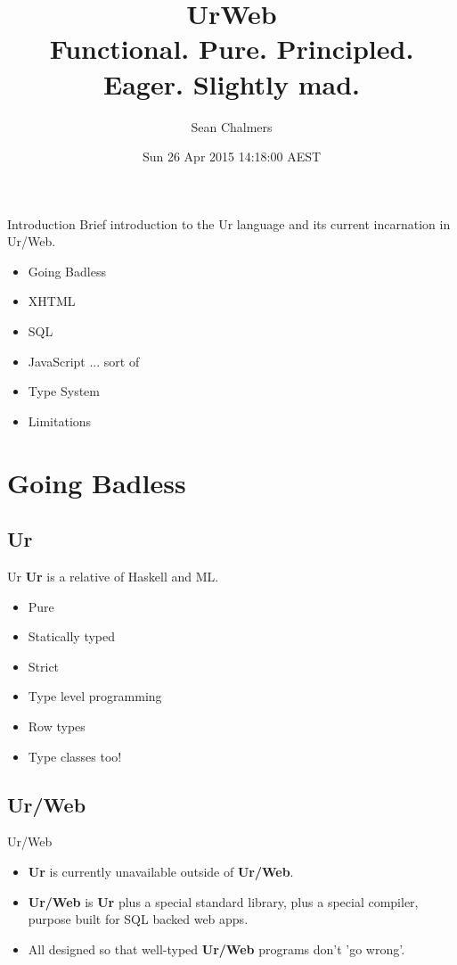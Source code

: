 \documentclass{beamer}
\title[Introduction to UrWeb]{UrWeb\\Functional. Pure. Principled. Eager. Slightly mad.}
\author{Sean Chalmers}
\date{Sun 26 Apr 2015 14:18:00 AEST}
\begin{document}
\begin{frame}
\titlepage
\end{frame}


\begin{frame}{Introduction}
Brief introduction to the Ur language and its current incarnation in Ur/Web.

\begin{itemize}
\item Going Badless
\item XHTML
\item SQL
\item JavaScript ... sort of
\item Type System
\item Limitations
\end{itemize}
\end{frame}

\section{Going Badless}
\subsection{Ur}

\begin{frame}{Ur}
\textbf{Ur} is a relative of Haskell and ML.

\begin{itemize}
\item Pure
\item Statically typed
\item Strict
\item Type level programming
\item Row types
\item Type classes too!
\end{itemize}
\end{frame}

\subsection{Ur/Web}
\begin{frame}{Ur/Web}

\begin{itemize}
\item \textbf{Ur} is currently unavailable outside of \textbf{Ur/Web}.
\item \textbf{Ur/Web} is \textbf{Ur} plus a special standard library,
 plus a special compiler, purpose built for SQL backed web apps.
\item All designed so that well-typed \textbf{Ur/Web} programs don't 'go wrong'.
\end{itemize}
\end{frame}
\end{document}
